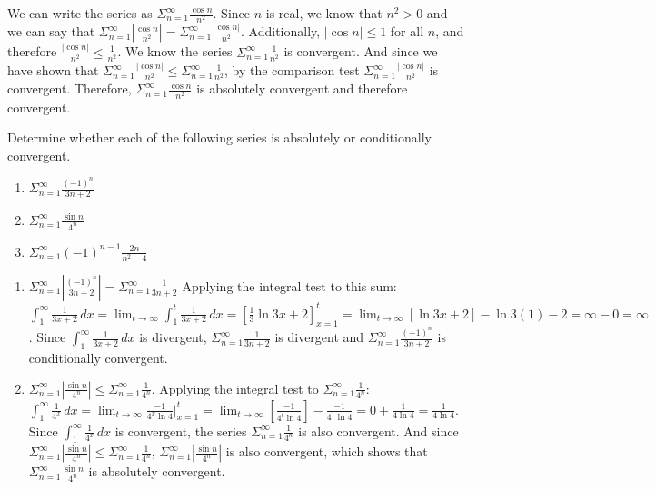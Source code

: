 \begin{Answer}[ref = absconv1]
We can write the series as $\Sigma_{n=1}^\infty \frac{\cos{n}}{n^2}$. Since 
$n$ is real, we know that $n^2 > 0$ and we can say that $\Sigma_{n=1}^\infty 
\left| \frac{\cos{n}}{n^2} \right| = \Sigma_{n=1}^\infty \frac{|\cos{n}|}
{n^2}$. Additionally, $|\cos{n}| \leq 1$ for all $n$, and therefore 
$\frac{|\cos{n}|}{n^2} \leq \frac{1}{n^2}$. We know the series $\Sigma_{n=1}^
\infty \frac{1}{n^2}$ is convergent. And since we have shown that $\Sigma_{n=1}
^\infty \frac{|\cos{n}|}{n^2} \leq \Sigma_{n=1}^\infty \frac{1}{n^2}$, by the 
comparison test $\Sigma_{n=1}^\infty \frac{|\cos{n}|}{n^2}$ is convergent. 
Therefore, $\Sigma_{n=1}^\infty \frac{\cos{n}}{n^2}$ is absolutely convergent 
and therefore convergent. 
\end{Answer}

\begin{Exercise}[label = absconv2]
Determine whether each of the following series is absolutely or conditionally 
convergent. 
\begin{enumerate}
\item $\Sigma_{n=1}^\infty \frac{(-1)^n}{3n + 2}$
\item $\Sigma_{n=1}^\infty \frac{\sin{n}}{4^n}$
\item $\Sigma_{n=1}^\infty (-1)^{n-1} \frac{2n}{n^2-4}$ 
\end{enumerate}
\vspace{50mm}
\end{Exercise}

\begin{Answer}[ref = absconv2]
\begin{enumerate}
\item $\Sigma_{n=1}^\infty \left| \frac{(-1)^n}{3n+2} \right| = \Sigma_{n=1}^
\infty \frac{1}{3n + 2}$ Applying the integral test to this sum: $\int_1^
\infty \frac{1}{3x+2}\,dx = \lim_{t \to \infty} \int_1^t \frac{1}{3x+2}\,dx = 
\left[ \frac{1}{3} \ln{3x + 2} \right]_{x=1}^t = \lim_{t \to \infty} \left[ 
\ln{3x + 2} \right] - \ln{3(1) - 2} = \infty - 0 = \infty$. Since $\int_1^\infty 
\frac{1}{3x + 2}\,dx$ is divergent, $\Sigma_{n=1}^\infty \frac{1}{3n + 2}$ is 
divergent and $\Sigma_{n=1}^\infty \frac{(-1)^n}{3n + 2}$ is conditionally 
convergent.
\item $\Sigma_{n=1}^\infty \left| \frac{\sin{n}}{4^n} \right| \leq \Sigma_{n=1}
^\infty \frac{1}{4^n}$. Applying the integral test to $\Sigma_{n=1}^\infty 
\frac{1}{4^n}$: $\int_1^\infty \frac{1}{4^x}\,dx = \lim_{t \to \infty} 
\frac{-1}{4^x \ln{4}}|_{x=1}^t = \lim_{t \to \infty} \left[ \frac{-1}{4^t 
\ln{4}} \right] - \frac{-1}{4^1 \ln{4}} = 0 + \frac{1}{4 \ln{4}} = \frac{1}{4 
\ln{4}}$. Since $\int_1^\infty \frac{1}{4^x}\,dx$ is convergent, the series 
$\Sigma_{n=1}^\infty \frac{1}{4^n}$ is also convergent. And since $\Sigma_{n=1}
^\infty \left| \frac{\sin{n}}{4^n} \right| \leq \Sigma_{n=1}^\infty 
\frac{1}{4^n}$, $\Sigma_{n=1}^\infty \left| \frac{\sin{n}}{4^n} \right|$ is 
also convergent, which shows that $\Sigma_{n=1}^\infty \frac{\sin{n}}{4^n}$ is 
absolutely convergent. 
\end{enumerate}
\end{Answer}

